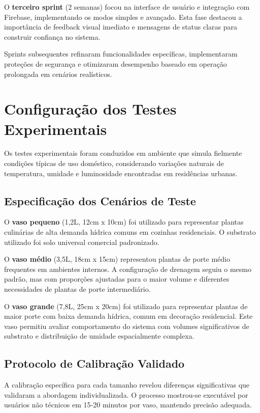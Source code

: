 \documentclass[oneside,english,brazilian]{UNISINOSmonografia}
\begin{document}
O \textbf{terceiro sprint} (2 semanas) focou na interface de usuário e integração com Firebase, implementando os modos simples e avançado. Esta fase destacou a importância de feedback visual imediato e mensagens de status claras para construir confiança no sistema.

Sprints subsequentes refinaram funcionalidades específicas, implementaram proteções de segurança e otimizaram desempenho baseado em operação prolongada em cenários realísticos.

\section{Configuração dos Testes Experimentais}

Os testes experimentais foram conduzidos em ambiente que simula fielmente condições típicas de uso doméstico, considerando variações naturais de temperatura, umidade e luminosidade encontradas em residências urbanas.

\subsection{Especificação dos Cenários de Teste}

O \textbf{vaso pequeno} (1,2L, 12cm x 10cm) foi utilizado para representar plantas culinárias de alta demanda hídrica comuns em cozinhas residenciais. O substrato utilizado foi solo universal comercial padronizado.

O \textbf{vaso médio} (3,5L, 18cm x 15cm) representou plantas de porte médio frequentes em ambientes internos. A configuração de drenagem seguiu o mesmo padrão, mas com proporções ajustadas para o maior volume e diferentes necessidades de plantas de porte intermediário.

O \textbf{vaso grande} (7,8L, 25cm x 20cm) foi utilizado para representar plantas de maior porte com baixa demanda hídrica, comum em decoração residencial. Este vaso permitiu avaliar comportamento do sistema com volumes significativos de substrato e distribuição de umidade espacialmente complexa.

\subsection{Protocolo de Calibração Validado}

A calibração específica para cada tamanho revelou diferenças significativas que validaram a abordagem individualizada. O processo mostrou-se executável por usuários não técnicos em 15-20 minutos por vaso, mantendo precisão adequada.
\end{document}

